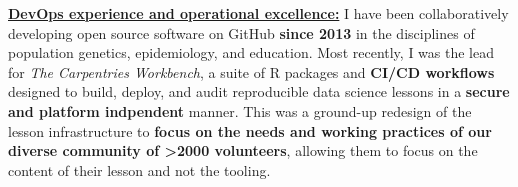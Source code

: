 
\vspace{2ex}

\underline{\textbf{DevOps experience and operational excellence:}}
I have been collaboratively developing open source software on GitHub \textbf{since 2013} in the disciplines of population genetics, epidemiology, and education.
Most recently, I was the lead for \textit{The Carpentries Workbench}, 
a suite of R packages and \textbf{CI/CD workflows} designed to build, deploy, and audit reproducible data science lessons in a \textbf{secure and platform indpendent} manner.
This was a ground-up redesign of the lesson infrastructure to \textbf{focus on
the needs and working practices of our diverse community of \textgreater2000 volunteers},
allowing them to focus on the content of their lesson and not the tooling.

\vspace{2ex}

